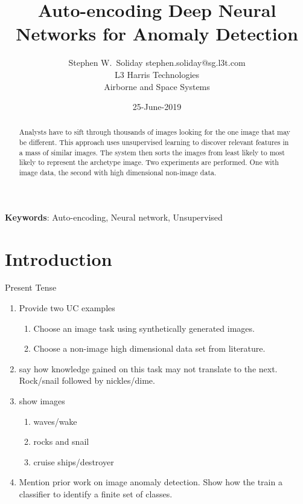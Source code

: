 \documentclass{article}
\begin{document}
\title{Auto-encoding Deep Neural Networks for Anomaly Detection}
\author{ \name Stephen W.~Soliday \email stephen.soliday@sg.l3t.com \\
  \addr L3 Harris Technologies \\ Airborne and Space Systems
}
\date{25-June-2019}

\maketitle

\begin{abstract}%

  Analysts have to sift through thousands of images looking for the one image that may be different.
  This approach uses unsupervised learning to discover relevant features in a mass of similar images.
  The system then sorts the images from least likely to most likely to represent the archetype image.
  Two experiments are performed. One with image data, the second with high dimensional non-image data.
  
\end{abstract}

\vspace{12pt}
\textbf{Keywords}: Auto-encoding, Neural network, Unsupervised

\section{Introduction\label{sec:intro}}

Present Tense

\begin{enumerate}
\item Provide two UC examples
  \begin{enumerate}
  \item Choose an image task using synthetically generated images.
  \item Choose a non-image high dimensional data set from literature.
  \end{enumerate}
\item say how knowledge gained on this task may not translate to the next.
  Rock/snail followed by nickles/dime.
\item show images
  \begin{enumerate}
  \item waves/wake
  \item rocks and snail
  \item cruise ships/destroyer
  \end{enumerate}
\item Mention prior work on image anomaly detection.
  Show how the train a classifier to identify a finite set of classes.
\end{enumerate}
\end{document}
